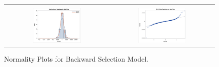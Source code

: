 \documentclass[11pt]{scrartcl} %
\begin{document}
\begin{figure}[H] %
	\centering
	\begin{tabular}{p{} p{}}
\hline	
	\multicolumn{1}{|c}{} &  \multicolumn{1}{c|}{} \\
		\multicolumn{1}{|c}{\includegraphics[width=0.48\textwidth]{../graphics/A2BWHist}} &
		\multicolumn{1}{c|}{\includegraphics[width=0.48\textwidth]{../graphics/A2BWqq}}\\
		\hline
	\end{tabular}		
	\caption{Normality Plots for Backward Selection Model.}
	\label{fig:A2BWQQ}
\end{figure}
\end{document}
